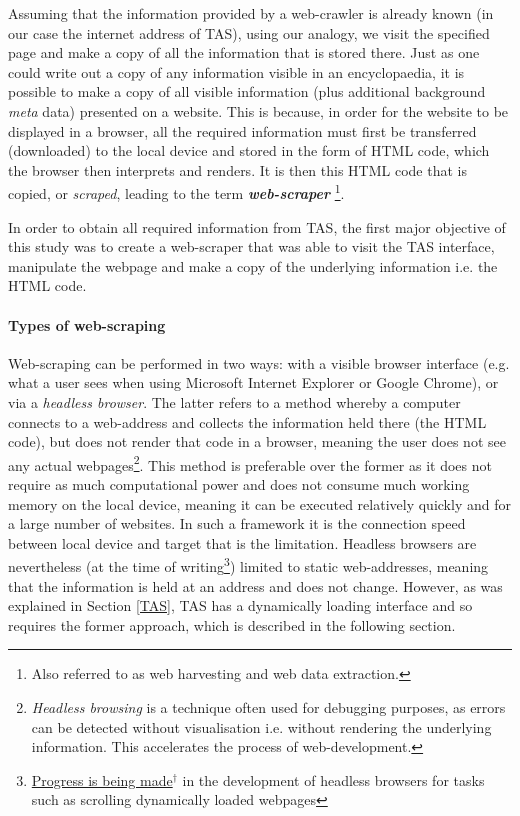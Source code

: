 \documentclass{article}
\begin{document}
Assuming that the information provided by a web-crawler is already known (in our case the internet address of TAS), using our analogy, we visit the specified page and make a copy of all the information that is stored there. Just as one could write out a copy of any information visible in an encyclopaedia, it is possible to make a copy of all visible information (plus additional background \emph{meta} data) presented on a website. This is because, in order for the website to be displayed in a browser, all the required information must first be transferred (downloaded) to the local device and stored in the form of HTML code, which the browser then interprets and renders. It is then this HTML code that is copied, or \emph{scraped}, leading to the term \textbf{\emph{web-scraper}} \footnote{Also referred to as web harvesting and web data extraction.}.

In order to obtain all required information from TAS, the first major objective of this study was to create a web-scraper that was able to visit the TAS interface, manipulate the webpage and make a copy of the underlying information i.e. the HTML code.


\paragraph{Types of web-scraping}
\label{sec-1-3-1-1}

Web-scraping can be performed in two ways: with a visible browser interface (e.g. what a user sees when using Microsoft Internet Explorer or Google Chrome), or via a \emph{headless browser}. The latter refers to a method whereby a computer connects to a web-address and collects the information held there (the HTML code), but does not render that code in a browser, meaning the user does not see any actual webpages\footnote{\emph{Headless browsing} is a technique often used for debugging purposes, as errors can be detected without visualisation i.e. without rendering the underlying information. This accelerates the process of web-development.}. This method is preferable over the former as it does not require as much computational power and does not consume much working memory on the local device, meaning it can be executed relatively quickly and for a large number of websites. In such a framework it is the connection speed between local device and target that is the limitation. Headless browsers are nevertheless (at the time of writing\footnote{\href{http://stackoverflow.com/questions/34942103/headless-endless-scroll-selenium}{Progress is being made$^{\dag{}}$} in the development of headless browsers for tasks such as scrolling dynamically loaded webpages}) limited to static web-addresses, meaning that the information is held at an address and does not change. However, as was explained in Section \ref{TAS}, TAS has a dynamically loading interface and so requires the former approach, which is described in the following section.
\end{document}

